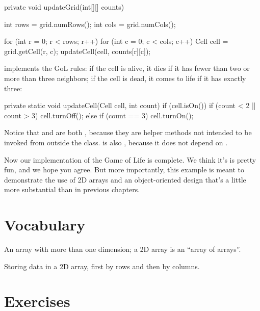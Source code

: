 \begin{code}
private void updateGrid(int[][] counts) {
    int rows = grid.numRows();
    int cols = grid.numCols();

    for (int r = 0; r < rows; r++) {
        for (int c = 0; c < cols; c++) {
            Cell cell = grid.getCell(r, c);
            updateCell(cell, counts[r][c]);
        }
    }
}
\end{code}

 implements the GoL rules: if the cell is alive, it dies if it has fewer than two or more than three neighbors; if the cell is dead, it comes to life if it has exactly three:

\begin{code}
private static void updateCell(Cell cell, int count) {
    if (cell.isOn()) {
        if (count < 2 || count > 3) {
            cell.turnOff();
        }
    } else {
        if (count == 3) {
            cell.turnOn();
        }
    }
}
\end{code}

Notice that  and  are both , because they are helper methods not intended to be invoked from outside the class.
 is also , because it does not depend on .

Now our implementation of the Game of Life is complete.
We think it's is pretty fun, and we hope you agree.
But more importantly, this example is meant to demonstrate the use of 2D arrays and an object-oriented design that's a little more substantial than in previous chapters.



\section{Vocabulary}

\begin{description}

An array with more than one dimension; a 2D array is an ``array of arrays''.

Storing data in a 2D array, first by rows and then by columns.

\end{description}


\section{Exercises}

